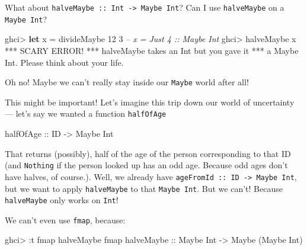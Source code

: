 \documentclass[]{article}
\newenvironment{Shaded}{}{}
\newcommand{\KeywordTok}[1]{\textcolor[rgb]{0.00,0.44,0.13}{\textbf{#1}}}
\newcommand{\DataTypeTok}[1]{\textcolor[rgb]{0.56,0.13,0.00}{#1}}
\newcommand{\DecValTok}[1]{\textcolor[rgb]{0.25,0.63,0.44}{#1}}
\newcommand{\CommentTok}[1]{\textcolor[rgb]{0.38,0.63,0.69}{\textit{#1}}}
\newcommand{\OtherTok}[1]{\textcolor[rgb]{0.00,0.44,0.13}{#1}}
\newcommand{\FunctionTok}[1]{\textcolor[rgb]{0.02,0.16,0.49}{#1}}
\newcommand{\NormalTok}[1]{#1}
\begin{document}
What about \texttt{halveMaybe\ ::\ Int\ -\textgreater{}\ Maybe\ Int}? Can I use
\texttt{halveMaybe} on a \texttt{Maybe\ Int}?

\begin{Shaded}
\begin{Highlighting}[]
\NormalTok{ghci}\FunctionTok{>} \KeywordTok{let}\NormalTok{ x }\FunctionTok{=}\NormalTok{ divideMaybe }\DecValTok{12} \DecValTok{3}     \CommentTok{-- x = Just 4 :: Maybe Int}
\NormalTok{ghci}\FunctionTok{>}\NormalTok{ halveMaybe x}
\FunctionTok{***} \DataTypeTok{SCARY} \DataTypeTok{ERROR}\FunctionTok{!}
\FunctionTok{***}\NormalTok{ halveMaybe takes an }\DataTypeTok{Int}\NormalTok{ but you gave it}
\FunctionTok{***}\NormalTok{ a }\DataTypeTok{Maybe} \DataTypeTok{Int}\FunctionTok{.}  \DataTypeTok{Please}\NormalTok{ think about your life}\FunctionTok{.}
\end{Highlighting}
\end{Shaded}

Oh no! Maybe we can't really stay inside our \texttt{Maybe} world after all!

This might be important! Let's imagine this trip down our world of uncertainty
--- let's say we wanted a function \texttt{halfOfAge}

\begin{Shaded}
\begin{Highlighting}[]
\OtherTok{halfOfAge ::} \DataTypeTok{ID} \OtherTok{->} \DataTypeTok{Maybe} \DataTypeTok{Int}
\end{Highlighting}
\end{Shaded}

That returns (possibly), half of the age of the person corresponding to that ID
(and \texttt{Nothing} if the person looked up has an odd age. Because odd ages
don't have halves, of course.). Well, we already have
\texttt{ageFromId\ ::\ ID\ -\textgreater{}\ Maybe\ Int}, but we want to apply
\texttt{halveMaybe} to that \texttt{Maybe\ Int}. But we can't! Because
\texttt{halveMaybe} only works on \texttt{Int}!

We can't even use \texttt{fmap}, because:

\begin{Shaded}
\begin{Highlighting}[]
\NormalTok{ghci}\FunctionTok{>} \FunctionTok{:}\NormalTok{t fmap halveMaybe}
\NormalTok{fmap}\OtherTok{ halveMaybe ::} \DataTypeTok{Maybe} \DataTypeTok{Int} \OtherTok{->} \DataTypeTok{Maybe}\NormalTok{ (}\DataTypeTok{Maybe} \DataTypeTok{Int}\NormalTok{)}
\end{Highlighting}
\end{Shaded}
\end{document}
